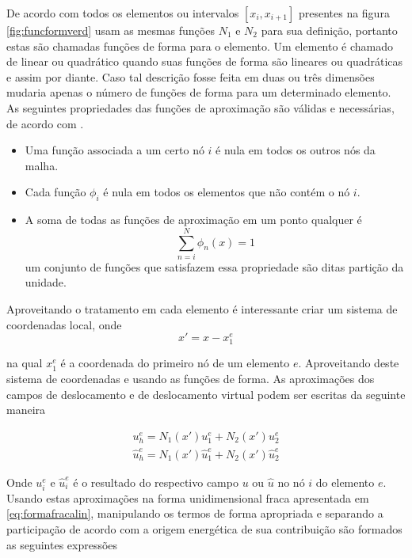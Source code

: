 De acordo com \cite{zienkiewicz2013} todos os elementos ou intervalos $ [x_i, x_{i+1}] $ presentes na figura \ref{fig:funcformverd} usam as mesmas funções $ N_1 $  e $ N_2 $ para sua definição, portanto estas são chamadas funções de forma para o elemento. Um elemento é chamado de linear ou quadrático quando suas funções de forma são lineares ou quadráticas e assim por diante. Caso tal descrição fosse feita em duas ou três dimensões mudaria apenas o número de funções de forma para um determinado elemento. As seguintes propriedades das funções de aproximação são válidas e necessárias, de acordo com \cite{Paulo}.

\begin{itemize}
    \item Uma função associada a um certo nó $ i $ é nula em todos os outros nós da malha.
    \item Cada função $ \phi_i $ é nula em todos os elementos que não contém o nó $i$.
    \item A soma de todas as funções de aproximação em um ponto qualquer é \begin{equation}
        \sum^N_{n=i} \phi_n (x) = 1
    \end{equation} um conjunto de funções que satisfazem essa propriedade são ditas partição da unidade. 
\end{itemize}

Aproveitando o tratamento em cada elemento é interessante criar um sistema de coordenadas local, onde
\begin{equation}
    x' =  x - x^e_1 
\end{equation}

na qual $ x^e_1 $ é a coordenada do primeiro nó de um elemento $e $. Aproveitando deste sistema de coordenadas e usando as funções de forma. As aproximações dos campos de deslocamento e de deslocamento virtual podem ser escritas da seguinte maneira

\begin{align}
    u_h^e = N_1(x')u_1^e + N_2(x')u_2^e \\
    \hat{u}_h^e = N_1(x')\hat{u}_1^e + N_2(x')\hat{u}_2^e
\end{align}

Onde $ u^e_i $ e $ \hat{u}^e_i $ é o resultado do respectivo campo $ u $ ou $ \hat{u} $ no nó $ i $ do elemento $ e $. Usando estas aproximações na forma unidimensional fraca apresentada em \ref{eq:formafracalin}, manipulando os termos de forma apropriada e separando a participação de acordo com a origem energética de sua contribuição são formados as seguintes expressões

